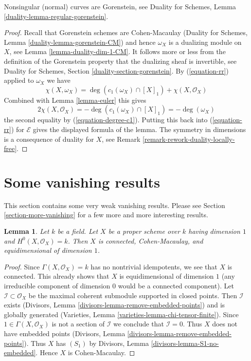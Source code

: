 \documentclass{stacks-project}
\theoremstyle{plain}
\newtheorem{lemma}[subsection]{Lemma}
\theoremstyle{definition}
\theoremstyle{remark}
\numberwithin{equation}{subsection}
\begin{document}
\noindent
Nonsingular (normal) curves are Gorenstein, see
Duality for Schemes, Lemma \ref{duality-lemma-regular-gorenstein}.

\begin{proof}
Recall that Gorenstein schemes are Cohen-Macaulay
(Duality for Schemes, Lemma \ref{duality-lemma-gorenstein-CM})
and hence $\omega_X$ is a dualizing module on $X$, see
Lemma \ref{lemma-duality-dim-1-CM}.
It follows more or less from the definition of the Gorenstein property
that the dualizing sheaf is invertible, see
Duality for Schemes, Section \ref{duality-section-gorenstein}.
By (\ref{equation-rr}) applied to $\omega_X$ we have
$$
\chi(X, \omega_X) = 
\deg(c_1(\omega_X) \cap [X]_1) + \chi(X, \mathcal{O}_X)
$$
Combined with Lemma \ref{lemma-euler} this gives
$$
2\chi(X, \mathcal{O}_X) = - \deg(c_1(\omega_X) \cap [X]_1) = - \deg(\omega_X)
$$
the second equality by (\ref{equation-degree-c1}). Putting this back into
(\ref{equation-rr}) for $\mathcal{E}$ gives the displayed formula of the lemma.
The symmetry in dimensions is a consequence of duality for $X$, see
Remark \ref{remark-rework-duality-locally-free}.
\end{proof}





\section{Some vanishing results}
\label{section-vanishing}

\noindent
This section contains some very weak vanishing results.
Please see Section \ref{section-more-vanishing} for
a few more and more interesting results.

\begin{lemma}
\label{lemma-automatic}
Let $k$ be a field. Let $X$ be a proper scheme over $k$ having dimension $1$
and $H^0(X, \mathcal{O}_X) = k$. Then $X$ is connected, Cohen-Macaulay,
and equidimensional of dimension $1$.
\end{lemma}

\begin{proof}
Since $\Gamma(X, \mathcal{O}_X) = k$ has no nontrivial idempotents,
we see that $X$ is connected. This already shows that $X$ is
equidimensional of dimension $1$ (any irreducible component
of dimension $0$ would be a connected component).
Let $\mathcal{I} \subset \mathcal{O}_X$
be the maximal coherent submodule supported in closed points.
Then $\mathcal{I}$ exists
(Divisors, Lemma \ref{divisors-lemma-remove-embedded-points})
and is globally generated
(Varieties, Lemma \ref{varieties-lemma-chi-tensor-finite}).
Since $1 \in \Gamma(X, \mathcal{O}_X)$ is not a section
of $\mathcal{I}$ we conclude that $\mathcal{I} = 0$.
Thus $X$ does not have embedded points
(Divisors, Lemma \ref{divisors-lemma-remove-embedded-points}).
Thus $X$ has $(S_1)$ by
Divisors, Lemma \ref{divisors-lemma-S1-no-embedded}.
Hence $X$ is Cohen-Macaulay.
\end{proof}
\end{document}
